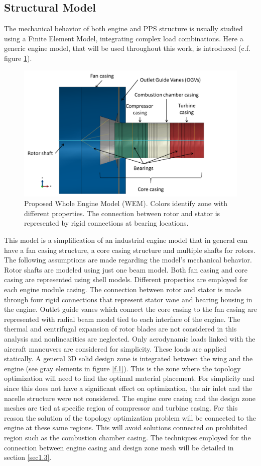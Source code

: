 \subsection{Structural Model}
\label{ssec1.2.1}
The mechanical behavior of both engine and PPS structure is usually studied using a Finite Element Model, integrating complex load combinations. Here a generic engine model, that will be used throughout this work, is introduced (c.f. figure \ref{enginewem}). 
\begin{figure}[hbt!]
\centering
\includegraphics[width=1\textwidth]{images/Ch1/enginegeometry}
\caption{Proposed Whole Engine Model (WEM). Colors identify zone with different properties. The connection between rotor and stator is represented by rigid connections at bearing locations.\label{enginewem}}
\end{figure}
This model is a simplification of an industrial engine model that in general can have a fan casing structure, a core casing structure and multiple shafts for rotors. The following assumptions are made regarding the model's mechanical behavior. Rotor shafts are modeled using just one beam model. Both fan casing and core casing are represented using shell models. Different properties are employed for each engine module casing. The connection between rotor and stator is made through four rigid connections that represent stator vane and bearing housing in the engine. Outlet guide vanes which connect the core casing to the fan casing are represented with radial beam model tied to each interface of the engine. The thermal and centrifugal expansion of rotor blades are not considered in this analysis and nonlinearities are neglected. Only aerodynamic loads linked with the aircraft maneuvers are considered for simplicity. These loads are applied statically. A general 3D solid design zone is integrated between the wing and the engine (see gray elements in figure \ref{f.1}). This is the zone where the topology optimization will need to find the optimal material placement. For simplicity and since this does not have a significant effect on optimization, the air inlet and the nacelle structure were not considered.  The engine core casing and the design zone meshes are tied at specific region of compressor and turbine casing. For this reason the solution of the topology optimization problem will be connected to the engine at these same regions. This will avoid solutions connected on prohibited region such as the combustion chamber casing. The techniques employed for the connection between engine casing and design zone mesh will be detailed in section \ref{sec1.3}.
